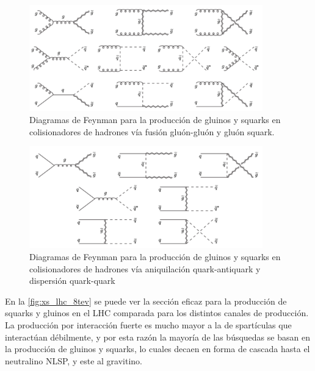 \begin{figure}[h]
  \centering \includegraphics[width=0.9\textwidth]{figures/figure_102}
  \caption{Diagramas de Feynman para la producción de gluinos y squarks en
    colisionadores de hadrones vía fusión gluón-gluón y gluón squark.}
  \label{fig:strongprod1}
\end{figure}

\begin{figure}[h]
  \centering \includegraphics[width=0.9\textwidth]{figures/figure_103}
  \caption{Diagramas de Feynman para la producción de gluinos y squarks en
    colisionadores de hadrones vía aniquilación quark-antiquark y dispersión
    quark-quark}
  \label{fig:strongprod2}
\end{figure}



En la \cref{fig:xs_lhc_8tev} se puede ver la sección eficaz para la producción
de squarks y gluinos en el LHC comparada para los distintos canales de
producción. La producción por interacción fuerte es mucho mayor a la de
spartículas que interactúan débilmente, y por esta razón la mayoría de las
búsquedas se basan en la producción de gluinos y squarks, lo cuales decaen en
forma de cascada hasta el neutralino NLSP, y este al gravitino.

